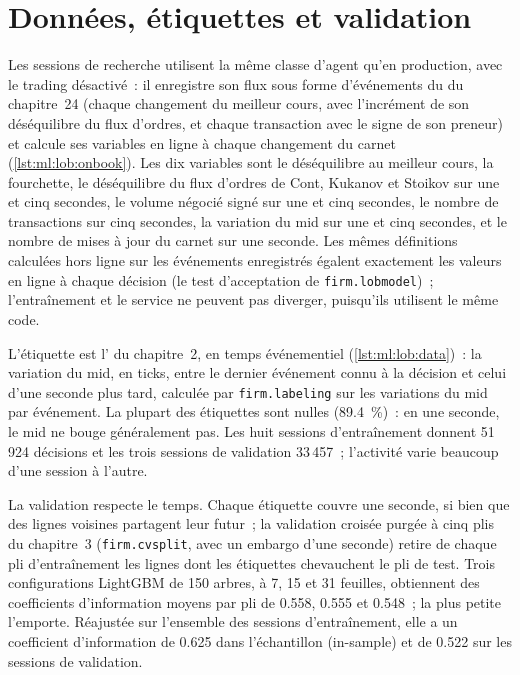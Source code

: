 \section{Données, étiquettes et validation}

Les sessions de recherche utilisent la même classe d'agent qu'en production, avec le trading désactivé~: il enregistre son flux sous forme d'événements
du  du chapitre~24 (chaque changement du meilleur cours, avec l'incrément de son déséquilibre du flux d'ordres, et chaque transaction avec le signe de son
preneur) et calcule ses variables en ligne à chaque changement du carnet (\cref{lst:ml:lob:onbook}). Les dix variables sont
le déséquilibre au meilleur cours, la fourchette, le déséquilibre du flux d'ordres de Cont, Kukanov et Stoikov sur une et cinq secondes, le
volume négocié signé sur une et cinq secondes, le nombre de transactions sur cinq secondes, la variation du mid sur une et cinq secondes, et le nombre
de mises à jour du carnet sur une seconde. Les mêmes définitions calculées hors ligne sur les événements enregistrés égalent exactement les valeurs en ligne
à chaque décision (le test d'acceptation de \texttt{firm.lobmodel})~; l'entraînement et le service ne peuvent pas diverger, puisqu'ils utilisent le
même code.

L'étiquette est l' du chapitre~2, en temps événementiel (\cref{lst:ml:lob:data})~: la variation du mid, en ticks, entre le dernier
événement connu à la décision et celui d'une seconde plus tard, calculée par \texttt{firm.labeling} sur les variations du mid par événement.
La plupart des étiquettes sont nulles (89.4~\%)~: en une seconde, le mid ne bouge généralement pas. Les huit sessions d'entraînement donnent 51\,924 décisions et les
trois sessions de validation 33\,457~; l'activité varie beaucoup d'une session à l'autre.

La validation respecte le temps. Chaque étiquette couvre une seconde, si bien que des lignes voisines partagent leur futur~; la validation croisée purgée à cinq plis du
chapitre~3 (\texttt{firm.cvsplit}, avec un embargo d'une seconde) retire de chaque pli d'entraînement les lignes dont les étiquettes chevauchent
le pli de test. Trois configurations LightGBM de 150 arbres, à 7, 15 et 31 feuilles, obtiennent des coefficients d'information moyens par pli de
0.558, 0.555 et 0.548~; la plus petite l'emporte. Réajustée sur l'ensemble des sessions d'entraînement, elle a un coefficient d'information de 0.625 dans l'échantillon (in-sample)
et de 0.522 sur les sessions de validation.

